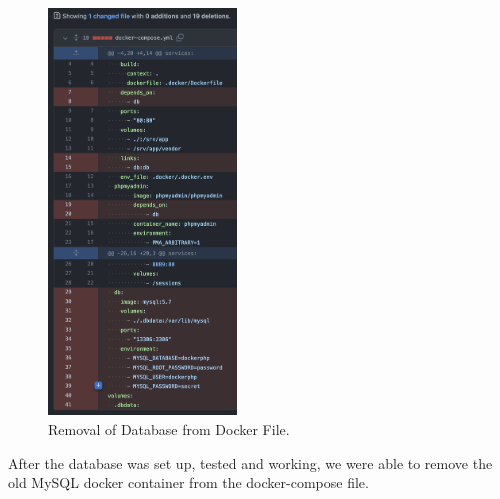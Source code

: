 \begin{figure}[!htbp]
    \centering
    \includegraphics[width=50mm]{resources/rds/docker}
    \caption{Removal of Database from Docker File.}
    \label{fig:rds-rm-docker-compose}
\end{figure}

After the database was set up, tested and working, we were able to remove the old MySQL docker container from the
docker-compose file.